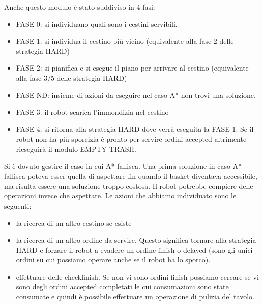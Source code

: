 Anche questo modulo è stato suddiviso in 4 fasi:
\begin{itemize}
  \item FASE 0: si individuano quali sono i cestini servibili.
  \item FASE 1: si individua il cestino più vicino (equivalente alla fase 2 delle strategia HARD)
  \item FASE 2: si pianifica e si esegue il piano per arrivare al cestino (equivalente alla fase 3/5 delle strategia HARD)
  \item FASE ND: insieme di azioni da eseguire nel caso A* non trovi una soluzione.
  \item FASE 3: il robot scarica l'immondizia nel cestino
  \item FASE 4: si ritorna alla strategia HARD dove verrà eseguita la FASE 1. Se il robot non ha più sporcizia è pronto per servire ordini accepted altrimente rieseguirà il modulo EMPTY TRASH.
\end{itemize}

Si è dovuto gestire il caso in cui A* fallisca. Una prima soluzione in caso A* fallisca poteva esser quella di aspettare fin quando il basket diventava accessibile, ma risulta essere una soluzione troppo costosa. Il robot potrebbe compiere delle operazioni invece che aspettare. Le azioni che abbiamo individuato sono le seguenti:
\begin{itemize}
  \item la ricerca di un altro cestino se esiste
  \item la ricerca di un altro ordine da servire. Questo significa tornare alla strategia HARD e forzare il robot a evadere un ordine finish o delayed (sono gli unici ordini su cui possiamo operare anche se il robot ha lo sporco).
  \item effettuare delle checkfinish. Se non vi sono ordini finish possiamo cercare se vi sono degli ordini accepted completati le cui consumazioni sono state consumate e quindi è possibile effettuare un operazione di pulizia del tavolo.
\end{itemize}

